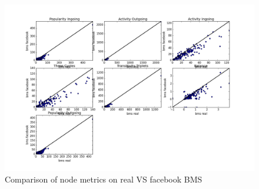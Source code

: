 \documentclass[journal]{IEEEtran}
\begin{document}
\begin{figure}[!htb]
\centering
\includegraphics[scale=.55]{bms}
\caption{Comparison of node metrics on real VS facebook BMS}
\end{figure}

\end{document}
